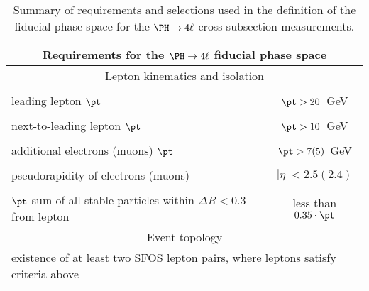 \begin{table}[!h!tb]
	\begin{center}
		\small
		\caption{
			Summary of requirements and selections used in the definition of the fiducial phase space for the $\Hllll$ cross subsection measurements.
			\label{tab:FidDef}
		}
		\begin{tabular}{|lc|} 
			\hline %
			\hline %
			\multicolumn{2}{|c|}{\textbf{Requirements for the $\Hllll$ fiducial phase space}} \\
			\hline %
			\hline %
			\multicolumn{2}{|c|}{Lepton kinematics and isolation} \\
			\hline %
			\vspace{-0.4cm} & \\
			leading lepton $\pt$ & $\pt  > 20$~GeV \\ 
			\vspace{-0.4cm} & \\
			next-to-leading lepton $\pt$ & $\pt  > 10$~GeV \\ 
			\vspace{-0.4cm} & \\
			additional electrons (muons) $\pt$ & $\pt  > 7(5)$~GeV \\ 
			\vspace{-0.4cm} & \\
			pseudorapidity of electrons (muons) & $|\eta| < 2.5(2.4)$ \\ 
			\vspace{-0.4cm} & \\
			$\pt$ sum of all stable particles within $\Delta R < 0.3$ from lepton & less than $0.35 \cdot \pt$ \\ 
			\hline %
			\hline %
			\multicolumn{2}{|c|}{Event topology} \\
			\hline %
			\multicolumn{2}{|l|}{existence of at least two SFOS lepton pairs, where leptons satisfy criteria above} \\

\end{tabular}
\end{center}
\end{table}
